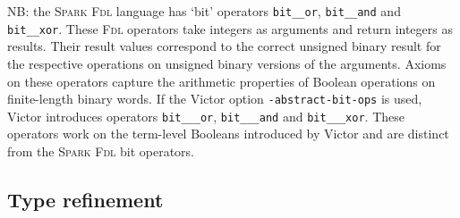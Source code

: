 \documentclass[12pt,fleqn]{article}
\newcommand{\spark}{\textsc{Spark}}
\newcommand{\fdl}{\textsc{Fdl}}
\begin{document}
NB: the \spark{} \fdl{} language has `bit' operators 
\texttt{bit\_\_or},
\texttt{bit\_\_and} and 
\texttt{bit\_\_xor}.
%
These \fdl{} operators take integers as arguments and return integers
as results.  Their result values correspond to the correct unsigned
binary result for the respective operations on unsigned binary
versions of the arguments.  Axioms on these operators capture the
arithmetic properties of Boolean operations on finite-length binary
words.
%
If the Victor option \texttt{-abstract-bit-ops} is used, Victor introduces 
operators
\texttt{bit\_\_\_or},
\texttt{bit\_\_\_and} and 
\texttt{bit\_\_\_xor}.
%
These operators work on the term-level Booleans introduced by Victor and
are distinct from the \spark{} \fdl{} bit operators.

\subsection{Type refinement}
\end{document}
